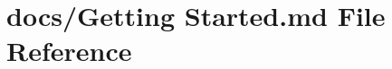 \hypertarget{Getting_01Started_8md}{\section{docs/\+Getting Started.\+md File Reference}
\label{Getting_01Started_8md}
}
